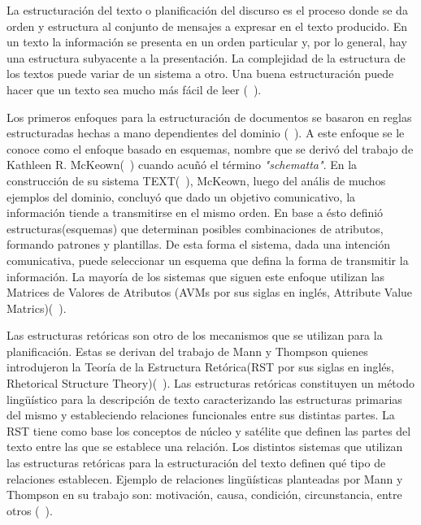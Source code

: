     La estructuración del texto o planificación del discurso es el proceso donde se da orden y estructura al conjunto de mensajes a expresar en el texto producido. En un texto la información se presenta en un orden particular 
y, por lo general, hay una estructura subyacente a la presentación. La complejidad de la estructura de los textos puede variar de un sistema a otro. Una buena estructuración puede hacer que un texto sea mucho más fácil 
de leer (~\cite{Reiter1997BuildingAN}).

    Los primeros enfoques para la estructuración de documentos se basaron en reglas estructuradas hechas a mano dependientes del dominio (~\cite{Gatt2018SurveyOT}). A este enfoque se le conoce como el enfoque basado en esquemas, nombre que 
se deriv\'o del trabajo de Kathleen R. McKeown(~\cite{mckeown1985discourse}) cuando acu\~n\'o el t\'ermino \textit{"schematta"}. En la construcci\'on de su sistema TEXT(~\cite{mckeown1985discourse}), McKeown, luego del an\'alis de muchos 
ejemplos del dominio, concluyó que dado un objetivo comunicativo, la información tiende a transmitirse en el mismo orden. En base a ésto defini\'o estructuras(esquemas) que determinan posibles combinaciones de atributos, formando patrones 
y plantillas. De esta forma el sistema, dada una intenci\'on comunicativa, puede seleccionar un esquema que defina la forma de transmitir la información. La mayor\'ia de los sistemas que siguen este enfoque utilizan 
las Matrices de Valores de Atributos (AVMs por sus siglas en inglés, Attribute Value Matrics)(~\cite{Perera2017RecentAI}).

    Las estructuras ret\'oricas son otro de los mecanismos que se utilizan para la planificación. Estas se derivan del trabajo de Mann y Thompson quienes introdujeron la Teor\'ia de la Estructura Ret\'orica(RST por
sus siglas en inglés, Rhetorical Structure Theory)(~\cite{mann1988rhetorical}). Las estructuras ret\'oricas constituyen un m\'etodo lingüístico para la descripci\'on de texto caracterizando las estructuras primarias del mismo y estableciendo 
relaciones funcionales entre sus distintas partes. La RST tiene como base los conceptos de n\'ucleo y sat\'elite que definen las partes del texto entre las que se establece una relaci\'on. Los distintos sistemas que utilizan las estructuras ret\'oricas 
para la estructuraci\'on del texto definen qué tipo de relaciones establecen. Ejemplo de relaciones lingüísticas planteadas por Mann y Thompson en su trabajo son: motivaci\'on, causa, condici\'on, circunstancia, entre otros (~\cite{mann1988rhetorical}). 

